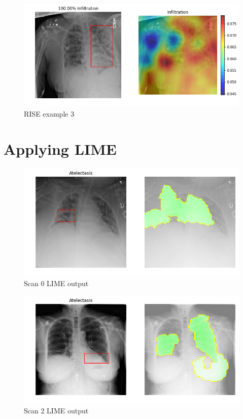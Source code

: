 \begin{figure}[h]
\centering
\caption{RISE example 3}
\includegraphics[width=12cm]{chapters/03_classification/images/rise_8.png}
\end{figure}


\section{Applying LIME}


\begin{figure}[h]
\centering
\caption{Scan 0 LIME output}
\includegraphics[width=12cm]{chapters/03_classification/images/lime_0.png}
\end{figure}

\begin{figure}[h]
\centering
\caption{Scan 2 LIME output}
\includegraphics[width=12cm]{chapters/03_classification/images/lime_2.png}
\end{figure}

